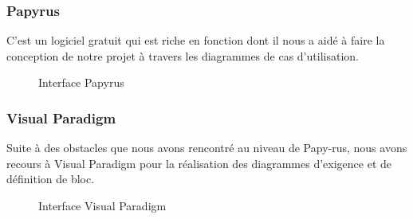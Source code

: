 	\subsubsection{Papyrus}
	C'est un logiciel gratuit qui est riche en fonction dont il nous a aidé à faire la conception de notre projet à travers les diagrammes de cas d'utilisation.
	\begin{figure}[h]
		\begin{center}
			\centering
		\end{center}
		\caption{Interface Papyrus}
	\end{figure}
	\newpage
	\subsubsection{Visual Paradigm}
	Suite à des obstacles que nous avons rencontré au niveau de Papy-rus, nous avons recours à Visual Paradigm pour la réalisation des diagrammes d'exigence et de définition de bloc.
	\begin{figure}[h]
		\begin{center}
			\centering
		\end{center}
		\caption{Interface Visual Paradigm}
	\end{figure}
